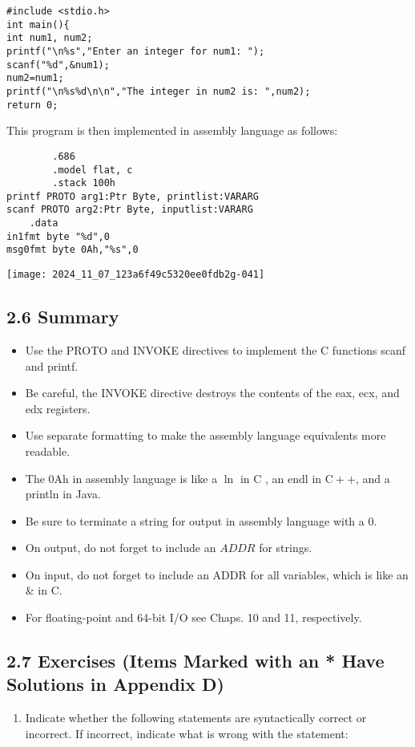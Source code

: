 \documentclass[10pt]{article}
\begin{document}
\begin{verbatim}
#include <stdio.h>
int main(){
int num1, num2;
printf("\n%s","Enter an integer for num1: ");
scanf("%d",&num1);
num2=num1;
printf("\n%s%d\n\n","The integer in num2 is: ",num2);
return 0;
\end{verbatim}

This program is then implemented in assembly language as follows:

\begin{verbatim}
        .686
        .model flat, c
        .stack 100h
printf PROTO arg1:Ptr Byte, printlist:VARARG
scanf PROTO arg2:Ptr Byte, inputlist:VARARG
    .data
in1fmt byte "%d",0
msg0fmt byte 0Ah,"%s",0
\end{verbatim}

\begin{center}
\texttt{[image: 2024\_11\_07\_123a6f49c5320ee0fdb2g-041]}
\end{center}

\subsection*{2.6 Summary}
\begin{itemize}
  \item Use the PROTO and INVOKE directives to implement the C functions scanf and printf.
  \item Be careful, the INVOKE directive destroys the contents of the eax, ecx, and edx registers.
  \item Use separate formatting to make the assembly language equivalents more readable.
  \item The 0Ah in assembly language is like a $\ln$ in C , an endl in $\mathrm{C++}$, and a println in Java.
  \item Be sure to terminate a string for output in assembly language with a 0.
  \item On output, do not forget to include an $A D D R$ for strings.
  \item On input, do not forget to include an ADDR for all variables, which is like an \& in C.
  \item For floating-point and 64-bit I/O see Chaps. 10 and 11, respectively.
\end{itemize}

\subsection*{2.7 Exercises (Items Marked with an * Have Solutions in Appendix D)}
\begin{enumerate}
  \item Indicate whether the following statements are syntactically correct or incorrect. If incorrect, indicate what is wrong with the statement:
\end{enumerate}
\end{document}
